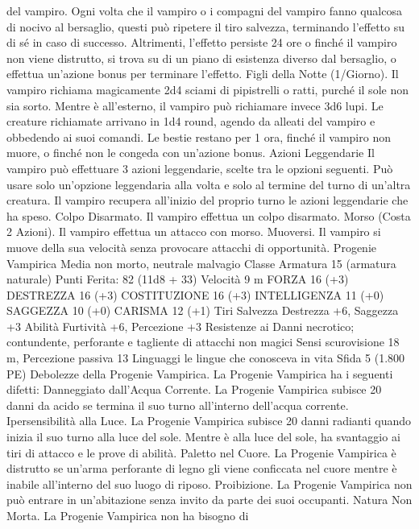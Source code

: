 \begin{multicols}{2}
del vampiro.
Ogni volta che il vampiro o i compagni del vampiro fanno
qualcosa di nocivo al bersaglio, questi può ripetere il tiro
salvezza, terminando l’effetto su di sé in caso di successo.
Altrimenti, l’effetto persiste 24 ore o finché il vampiro non viene
distrutto, si trova su di un piano di esistenza diverso dal
bersaglio, o effettua un’azione bonus per terminare l’effetto.
Figli della Notte (1/Giorno). Il vampiro richiama magicamente
2d4 sciami di pipistrelli o ratti, purché il sole non sia sorto.
Mentre è all’esterno, il vampiro può richiamare invece 3d6 lupi.
Le creature richiamate arrivano in 1d4 round, agendo da alleati
del vampiro e obbedendo ai suoi comandi. Le bestie restano per
1 ora, finché il vampiro non muore, o finché non le congeda con
un’azione bonus.
Azioni Leggendarie
Il vampiro può effettuare 3 azioni leggendarie, scelte tra le
opzioni seguenti. Può usare solo un’opzione leggendaria alla
volta e solo al termine del turno di un’altra creatura. Il vampiro
recupera all’inizio del proprio turno le azioni leggendarie che ha
speso.
Colpo Disarmato. Il vampiro effettua un colpo disarmato.
Morso (Costa 2 Azioni). Il vampiro effettua un attacco con
morso.
Muoversi. Il vampiro si muove della sua velocità senza
provocare attacchi di opportunità.
Progenie Vampirica
Media non morto, neutrale malvagio
Classe Armatura 15 (armatura naturale)
\hspace*{0pt}\hfill{Punti Ferita}: 82 (11d8 + 33)
Velocità 9 m
FORZA 16 (+3)
DESTREZZA 16 (+3)
COSTITUZIONE 16 (+3)
INTELLIGENZA 11 (+0)
SAGGEZZA 10 (+0)
CARISMA 12 (+1)
Tiri Salvezza Destrezza +6, Saggezza +3
Abilità Furtività +6, Percezione +3
Resistenze ai Danni necrotico; contundente, perforante e
tagliente di attacchi non magici
Sensi scurovisione 18 m, Percezione passiva 13
Linguaggi le lingue che conosceva in vita
Sfida 5 (1.800 PE)
Debolezze della Progenie Vampirica. La Progenie Vampirica ha
i seguenti difetti:
Danneggiato dall’Acqua Corrente. La Progenie Vampirica
subisce 20 danni da acido se termina il suo turno all’interno
dell’acqua corrente.
Ipersensibilità alla Luce. La Progenie Vampirica subisce 20
danni radianti quando inizia il suo turno alla luce del sole.
Mentre è alla luce del sole, ha svantaggio ai tiri di attacco e le
prove di abilità.
Paletto nel Cuore. La Progenie Vampirica è distrutto se un’arma
perforante di legno gli viene conficcata nel cuore mentre è
inabile all’interno del suo luogo di riposo.
Proibizione. La Progenie Vampirica non può entrare in
un’abitazione senza invito da parte dei suoi occupanti.
Natura Non Morta. La Progenie Vampirica non ha bisogno di

\end{multicols}
